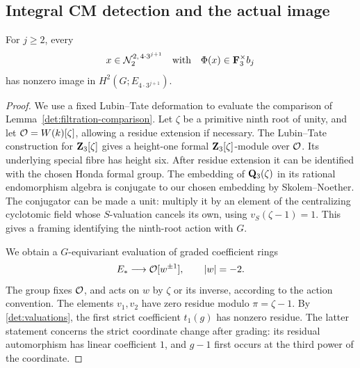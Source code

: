 \subsection{Integral CM detection and the actual image}

\begin{lemma}\label{det:cm-evaluation}
For \(j\geq2\), every
\[
 x\in\mathcal N_2^{2,\,4\cdot3^{j+1}}
 \quad\text{with}\quad
 \Phi(x)\in\mathbf F_3^\times b_j
\]
has nonzero image in \(H^2(G;E_{4\cdot3^{j+1}})\).
\end{lemma}

\begin{proof}
We use a fixed Lubin--Tate deformation to evaluate the
comparison of Lemma~\ref{det:filtration-comparison}.
Let \(\zeta\) be a primitive ninth root of unity, and let
\(\mathcal O=W(k)[\zeta]\), allowing a residue extension if necessary.
The Lubin--Tate construction for \(\mathbf Z_3[\zeta]\)
\cite[Theorem~1]{LubinTateLocal}
gives a height-one formal \(\mathbf Z_3[\zeta]\)-module over
\(\mathcal O\).  Its underlying special fibre has height six.
After residue extension it can be identified with the chosen
Honda formal group.  The embedding of
\(\mathbf Q_3(\zeta)\) in its rational endomorphism algebra is conjugate
to our chosen embedding by Skolem--Noether.
The conjugator can be made a unit: multiply it by an element
of the centralizing cyclotomic field whose \(S\)-valuation
cancels its own, using \(v_S(\zeta-1)=1\).
This gives a framing identifying the ninth-root action with \(G\).

We obtain a \(G\)-equivariant evaluation of graded coefficient
rings
\[
 E_*\longrightarrow \mathcal O[w^{\pm1}],\qquad |w|=-2.
\]
The group fixes \(\mathcal O\), and acts on \(w\) by \(\zeta\)
or its inverse, according to the action convention.
The elements \(v_1,v_2\) have zero residue modulo
\(\pi=\zeta-1\).
By \eqref{det:valuations}, the first strict coefficient
\(t_1(g)\) has nonzero residue.
The latter statement concerns the strict coordinate change
after grading: its residual automorphism has linear coefficient
\(1\), and \(g-1\) first occurs at the third power of the
coordinate.


\end{proof}
